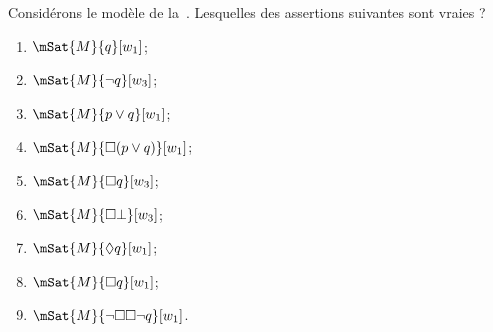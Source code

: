 \documentclass[../../../include/open-logic-section]{subfiles}
\begin{document}
\begin{prob}
  Considérons le modèle de la~.
  Lesquelles des assertions suivantes sont vraies ?
    \begin{enumerate}
    \item $\mSat{M}{q}[w_1]$;
    \item $\mSat{M}{\lnot q}[w_3]$;
    \item $\mSat{M}{p \lor q}[w_1]$;
    \item $\mSat{M}{\Box (p \lor q)}[w_1]$;
    \item $\mSat{M}{\Box q}[w_3]$;
    \item $\mSat{M}{\Box \bot}[w_3]$;
    \item $\mSat{M}{\Diamond q}[w_1]$;
    \item $\mSat{M}{\Box q}[w_1]$;
    \item $\mSat{M}{\lnot \Box\Box \lnot q}[w_1]$.
    \end{enumerate}
\end{prob}
\end{document}
